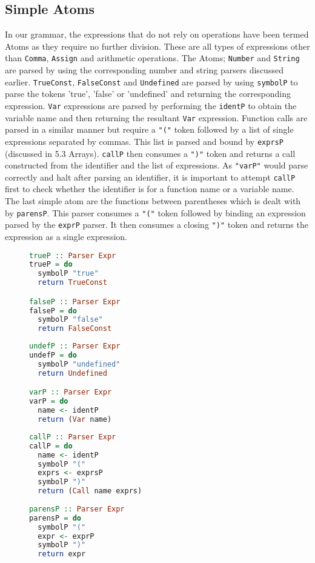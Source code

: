 \documentclass{article}
\begin{document}
\subsection{Simple Atoms}
In our grammar, the expressions that do not rely on operations have been termed Atoms as they require no further division. These are all types of expressions other than \texttt{Comma}, \texttt{Assign} and arithmetic operations. The Atoms; \texttt{Number} and \texttt{String} are parsed by using the corresponding number and string parsers discussed earlier. \texttt{TrueConst}, \texttt{FalseConst} and \texttt{Undefined} are parsed by using \texttt{symbolP} to parse the tokens 'true', 'false' or 'undefined' and returning the corresponding expression.
\bigbreak
\texttt{Var} expressions are parsed by performing the \texttt{identP} to obtain the variable name and then returning the resultant \texttt{Var} expression. 
\bigbreak
Function calls are parsed in a similar manner but require a \texttt{"("} token followed by a list of single expressions separated by commas. This list is parsed and bound by \texttt{exprsP} (discussed in 5.3 Arrays). \texttt{callP} then consumes a \texttt{")"} token and returns a call constructed from the identifier and the list of expressions. As \texttt{"varP"} would parse correctly and halt after parsing an identifier, it is important to attempt \texttt{callP} first to check whether the identifier is for a function name or a variable name. 
\bigbreak
The last simple atom are the functions between parentheses which is dealt with by \texttt{parensP}. This parser consumes a \texttt{"("} token followed by binding an expression parsed by the \texttt{exprP} parser. It then consumes a closing \texttt{")"} token and returns the expression as a single expression.
\begin{figure}[h!]
\begin{minipage}{0.33\textwidth}
\centering
\begin{lstlisting}[language=Haskell]
trueP :: Parser Expr
trueP = do
  symbolP "true"
  return TrueConst

falseP :: Parser Expr
falseP = do
  symbolP "false"
  return FalseConst
\end{lstlisting}
\end{minipage}
\begin{minipage}{0.33\textwidth}
\centering
\begin{lstlisting}[language=Haskell]
undefP :: Parser Expr
undefP = do
  symbolP "undefined"
  return Undefined

varP :: Parser Expr
varP = do
  name <- identP
  return (Var name)
\end{lstlisting}
\end{minipage}
\begin{minipage}{0.33\textwidth}
\centering
\begin{lstlisting}[language=Haskell]
callP :: Parser Expr
callP = do
  name <- identP
  symbolP "("
  exprs <- exprsP
  symbolP ")"
  return (Call name exprs)
  
parensP :: Parser Expr
parensP = do
  symbolP "("
  expr <- exprP
  symbolP ")"
  return expr
\end{lstlisting}
\end{minipage}
\end{figure}
\\
\end{document}
